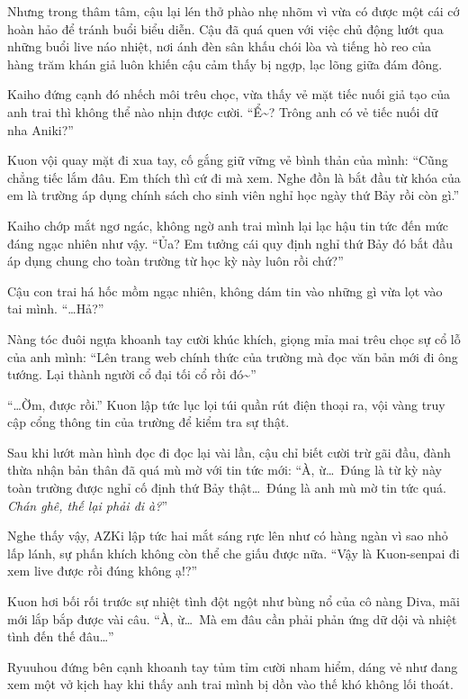 \documentclass[../main.tex]{subfiles}
\begin{document}
Nhưng trong thâm tâm, cậu lại lén thở phào nhẹ nhõm vì vừa có được một cái cớ hoàn hảo để tránh buổi biểu diễn. Cậu đã quá quen với việc chủ động lướt qua những buổi live náo nhiệt, nơi ánh đèn sân khấu chói lòa và tiếng hò reo của hàng trăm khán giả luôn khiến cậu cảm thấy bị ngợp, lạc lõng giữa đám đông.

Kaiho đứng cạnh đó nhếch môi trêu chọc, vừa thấy vẻ mặt tiếc nuối giả tạo của anh trai thì không thể nào nhịn được cười. ``Ể\~{}? Trông anh có vẻ tiếc nuối dữ nha Aniki?''

Kuon vội quay mặt đi xua tay, cố gắng giữ vững vẻ bình thản của mình: ``Cũng chẳng tiếc lắm đâu. Em thích thì cứ đi mà xem. Nghe đồn là bắt đầu từ khóa của em là trường áp dụng chính sách cho sinh viên nghỉ học ngày thứ Bảy rồi còn gì.''

Kaiho chớp mắt ngơ ngác, không ngờ anh trai mình lại lạc hậu tin tức đến mức đáng ngạc nhiên như vậy. ``Ủa? Em tưởng cái quy định nghỉ thứ Bảy đó bắt đầu áp dụng chung cho toàn trường từ học kỳ này luôn rồi chứ?''

Cậu con trai há hốc mồm ngạc nhiên, không dám tin vào những gì vừa lọt vào tai mình. ``\dots Hả?''

Nàng tóc đuôi ngựa khoanh tay cười khúc khích, giọng mỉa mai trêu chọc sự cổ lỗ của anh mình: ``Lên trang web chính thức của trường mà đọc văn bản mới đi ông tướng. Lại thành người cổ đại tối cổ rồi đó\~{}''

``\dots Ờm, được rồi.'' Kuon lập tức lục lọi túi quần rút điện thoại ra, vội vàng truy cập cổng thông tin của trường để kiểm tra sự thật.

Sau khi lướt màn hình đọc đi đọc lại vài lần, cậu chỉ biết cười trừ gãi đầu, đành thừa nhận bản thân đã quá mù mờ với tin tức mới: ``À, ừ\dots\ Đúng là từ kỳ này toàn trường được nghỉ cố định thứ Bảy thật\dots\ Đúng là anh mù mờ tin tức quá. \textit{Chán ghê, thế lại phải đi à?}''

Nghe thấy vậy, AZKi lập tức hai mắt sáng rực lên như có hàng ngàn vì sao nhỏ lấp lánh, sự phấn khích không còn thể che giấu được nữa. ``Vậy là Kuon-senpai đi xem live được rồi đúng không ạ!?''

Kuon hơi bối rối trước sự nhiệt tình đột ngột như bùng nổ của cô nàng Diva, mãi mới lắp bắp được vài câu. ``À, ừ\dots\ Mà em đâu cần phải phản ứng dữ dội và nhiệt tình đến thế đâu\dots''

Ryuuhou đứng bên cạnh khoanh tay tủm tỉm cười nham hiểm, dáng vẻ như đang xem một vở kịch hay khi thấy anh trai mình bị dồn vào thế khó không lối thoát.
\end{document}
